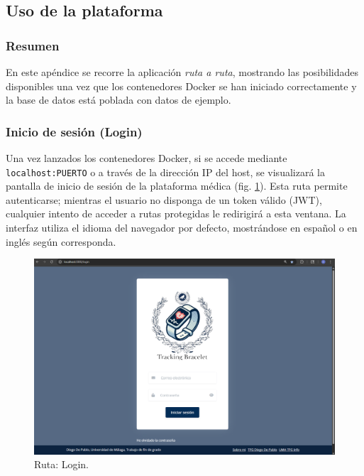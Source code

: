\documentclass[12pt, a4paper]{article}
\begin{document}
\begin{umaappendices}
	\newpage
	
	\subsection{Uso de la plataforma}
	\label{sec:plataforma}
	
	\subsubsection{Resumen}
	En este apéndice se recorre la aplicación \emph{ruta a ruta}, mostrando las posibilidades disponibles una vez que los contenedores Docker se han iniciado correctamente y la base de datos está poblada con datos de ejemplo.
	
	\subsubsection{Inicio de sesión (Login)}
	Una vez lanzados los contenedores Docker, si se accede mediante \texttt{localhost:PUERTO} o a través de la dirección IP del host, se visualizará la pantalla de inicio de sesión de la plataforma médica (fig. \ref{fig:login}). Esta ruta permite autenticarse; mientras el usuario no disponga de un token válido (JWT), cualquier intento de acceder a rutas protegidas le redirigirá a esta ventana. La interfaz utiliza el idioma del navegador por defecto, mostrándose en español o en inglés según corresponda.
	
	\begin{figure}[htbp]
		\centering
		\includegraphics[width=1\textwidth]{images/1_login.png}
		\caption[Ejemplo]{Ruta: Login.}
		\label{fig:login}
	\end{figure}
	

\end{umaappendices}
\end{document}
